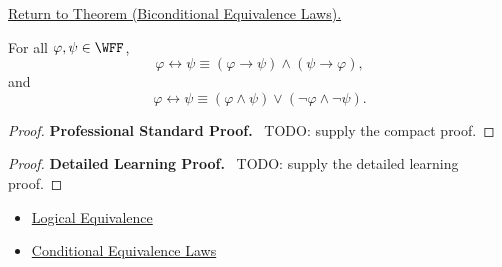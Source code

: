 \newpage
{}
\label{prf:biconditional-equivalence-laws-propositional-logic}

\begin{remark*}[Return]
\hyperref[thm:biconditional-equivalence-laws-propositional-logic]{Return to Theorem (Biconditional Equivalence Laws).}
\end{remark*}

\begin{theorem*}
For all \(\varphi,\psi\in\WFF\),
\[
\varphi\leftrightarrow\psi
\equiv
(\varphi\to\psi)\land(\psi\to\varphi),
\]
and
\[
\varphi\leftrightarrow\psi
\equiv
(\varphi\land\psi)\lor(\neg\varphi\land\neg\psi).
\]
\end{theorem*}

\begin{proof}
\textbf{Professional Standard Proof.}~
TODO: supply the compact proof.
\end{proof}

\begin{proof}
\textbf{Detailed Learning Proof.}~
TODO: supply the detailed learning proof.
\end{proof}

\begin{remark*}
\end{remark*}

\begin{dependencies}
\begin{itemize}
  \item \hyperref[def:logical-equivalence-propositional-logic]{Logical Equivalence}
  \item \hyperref[thm:conditional-equivalence-laws-propositional-logic]{Conditional Equivalence Laws}
\end{itemize}
\end{dependencies}

\clearpage

